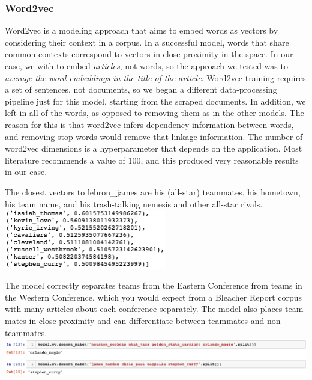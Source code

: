 \documentclass[11pt]{article}
\begin{document}
\subsubsection{Word2vec}
Word2vec is a modeling approach that aims to embed words as vectors by considering their context in a corpus.  In a successful model, words that share common contexts correspond to vectors in close proximity in the space.  In our case, we with to embed \textit{articles}, not words,  so the approach we tested was to \textit{average the word embeddings in the title of the article}. 
Word2vec training requires a set of sentences, not documents, so we began a different data-processing pipeline just for this model, starting from the scraped documents. In addition, we left in all of the words, as opposed to removing them as in the other models. The reason for this is that word2vec infers dependency information between words, and removing stop words would remove that linkage information.
The number of word2vec dimensions is a hyperparameter that depends on the application. Most literature recommends a value of 100, and this produced very reasonable results in our case.

The closest vectors to lebron\_james are his (all-star) teammates, his hometown, his team name, and his trash-talking nemesis and other all-star rivals. \\
\includegraphics[width=200pt]{james_word2vec.png} 

The model correctly separates teams from the Eastern Conference from teams in the Western Conference, which you would expect from a Bleacher Report corpus with many articles about each conference separately. The model also places team mates in close proximity and can differentiate between teammates and non teammates. \\
\includegraphics[width=450pt]{word2vec_diffs.png} 
\end{document}
